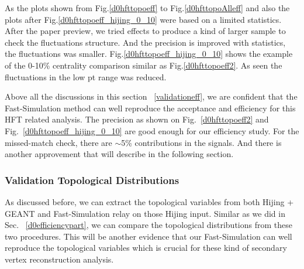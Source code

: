 As the plots shown from Fig.\ref{d0hfttopoeff} to Fig.\ref{d0hfttopoAlleff} and also the plots after Fig.\ref{d0hfttopoeff_hijing_0_10} were based on a limited statistics. After the paper preview, we tried effects to produce a kind of larger sample to check the fluctuations structure. And the precision is improved with statistics, the fluctuations was smaller. Fig.\ref{d0hfttopoeff_hijing_0_10} shows the example of the 0-10\% centrality comparison similar as Fig.\ref{d0hfttopoeff2}. As seen the fluctuations in the low pt range was reduced.

Above all the discussions in this section ~\ref{validationeff}, we are confident that the Fast-Simulation method can well reproduce the acceptance and efficiency for this HFT related analysis. The precision as shown on Fig.~\ref{d0hfttopoeff2} and Fig.~\ref{d0hfttopoeff_hijing_0_10} are good enough for our efficiency study. For the missed-match check, there are $\sim$5\% contributions in the signals. And there is another approvement that will describe in the following section.

\subsubsection{Validation Topological Distributions}
\label{validationTopo}

As discussed before, we can extract the topological variables from both Hijing + GEANT and Fast-Simulation relay on those Hijing input. Similar as we did in Sec. ~\ref{d0efficiencypart}, we can compare the topological distributions from these two procedures. This will be another evidence that our Fast-Simulation can well reproduce the topological variables which is crucial for these kind of secondary vertex reconstruction analysis.

